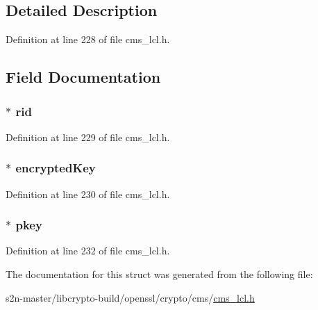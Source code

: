 \subsection{Detailed Description}


Definition at line 228 of file cms\+\_\+lcl.\+h.



\subsection{Field Documentation}
\subsubsection[{\texorpdfstring{rid}{rid}}]{$\ast$ rid}\hypertarget{struct_c_m_s___recipient_encrypted_key__st_a82da84293f12ac42af279e7e0445ddd7}{}\label{struct_c_m_s___recipient_encrypted_key__st_a82da84293f12ac42af279e7e0445ddd7}


Definition at line 229 of file cms\+\_\+lcl.\+h.

\subsubsection[{\texorpdfstring{encrypted\+Key}{encryptedKey}}]{$\ast$ encrypted\+Key}\hypertarget{struct_c_m_s___recipient_encrypted_key__st_a683d211b1506ecf342fb4d35a34aed33}{}\label{struct_c_m_s___recipient_encrypted_key__st_a683d211b1506ecf342fb4d35a34aed33}


Definition at line 230 of file cms\+\_\+lcl.\+h.

\subsubsection[{\texorpdfstring{pkey}{pkey}}]{$\ast$ pkey}\hypertarget{struct_c_m_s___recipient_encrypted_key__st_a76a3c5d8ec8f468075eb3e366a35a83c}{}\label{struct_c_m_s___recipient_encrypted_key__st_a76a3c5d8ec8f468075eb3e366a35a83c}


Definition at line 232 of file cms\+\_\+lcl.\+h.



The documentation for this struct was generated from the following file\+:\begin{DoxyCompactItemize}
\item 
s2n-\/master/libcrypto-\/build/openssl/crypto/cms/\hyperlink{cms__lcl_8h}{cms\+\_\+lcl.\+h}\end{DoxyCompactItemize}
